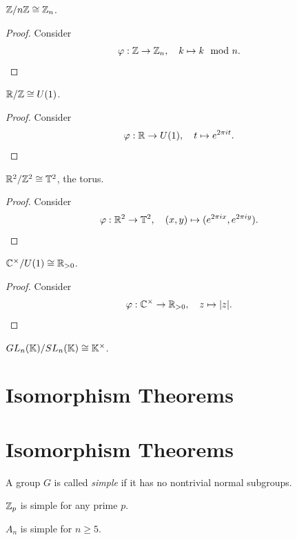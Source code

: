 \begin{example}
  \(\mathbb{Z}/n\mathbb{Z} \cong \mathbb{Z}_n\).
\end{example}
\begin{proof}
  Consider \[
    \varphi:\mathbb{Z}\to\mathbb{Z}_n, \quad
    k \mapsto k\mod n.
  \]
\end{proof}

\begin{example}
  \(\mathbb{R}/\mathbb{Z} \cong U(1)\).
\end{example}
\begin{proof}
  Consider \[
    \varphi:\mathbb{R}\to U(1), \quad
    t \mapsto e^{2\pi it}.
  \]
\end{proof}

\begin{example}
  \(\mathbb{R}^2/\mathbb{Z}^2 \cong \mathbb{T}^2\), the torus.
\end{example}
\begin{proof}
  Consider \[
    \varphi:\mathbb{R}^2\to \mathbb{T}^2, \quad
    (x,y) \mapsto (e^{2\pi ix}, e^{2\pi iy}).
  \]
\end{proof}

\begin{example}
  \(\mathbb{C}^\times/U(1) \cong \mathbb{R}_{>0}\).
\end{example}
\begin{proof}
  Consider \[
    \varphi:\mathbb{C}^\times\to\mathbb{R}_{>0}, \quad
    z \mapsto |z|.
  \]
\end{proof}

\begin{example}
  \(GL_n(\mathbb{K})/SL_n(\mathbb{K}) \cong \mathbb{K}^\times\).
\end{example}

\section{Isomorphism Theorems}

\section{Isomorphism Theorems}

\begin{definition}
  A group \(G\) is called \emph{simple} if it has no nontrivial normal subgroups.
\end{definition}

\begin{example}
  \(\mathbb{Z}_p\) is simple for any prime \(p\).
\end{example}

\begin{example}
  \(A_n\) is simple for \(n\geq 5\).
\end{example}


